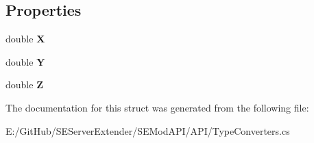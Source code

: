 \subsection*{Properties}
\begin{DoxyCompactItemize}
\item 
\hypertarget{struct_s_e_mod_a_p_i_1_1_a_p_i_1_1_vector3_d_wrapper_a0ff54e276b10b14e22245ba6a5dc193f}{}double {\bfseries X}\label{struct_s_e_mod_a_p_i_1_1_a_p_i_1_1_vector3_d_wrapper_a0ff54e276b10b14e22245ba6a5dc193f}

\item 
\hypertarget{struct_s_e_mod_a_p_i_1_1_a_p_i_1_1_vector3_d_wrapper_a9ab3c6d91499b07ee5d201c25c529839}{}double {\bfseries Y}\label{struct_s_e_mod_a_p_i_1_1_a_p_i_1_1_vector3_d_wrapper_a9ab3c6d91499b07ee5d201c25c529839}

\item 
\hypertarget{struct_s_e_mod_a_p_i_1_1_a_p_i_1_1_vector3_d_wrapper_a541cb2f8225dd1b9eb2407d27710d50c}{}double {\bfseries Z}\label{struct_s_e_mod_a_p_i_1_1_a_p_i_1_1_vector3_d_wrapper_a541cb2f8225dd1b9eb2407d27710d50c}

\end{DoxyCompactItemize}


The documentation for this struct was generated from the following file\+:\begin{DoxyCompactItemize}
\item 
E\+:/\+Git\+Hub/\+S\+E\+Server\+Extender/\+S\+E\+Mod\+A\+P\+I/\+A\+P\+I/Type\+Converters.\+cs\end{DoxyCompactItemize}
